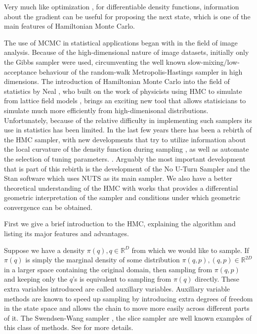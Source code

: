 \documentclass[12pt]{report}
\begin{document}
Very much like optimization \cite{wright1999numerical}, for differentiable density
functions, information about the gradient can be useful for proposing the next
state, which is one of the main features of Hamiltonian Monte Carlo.


The use of MCMC in statistical applications began with \cite{geman1984stochastic,besag1986statistical} in the field of image analysis. Because of the high-dimensional nature of image datasets, initially only the Gibbs sampler were used, circumventing the well known slow-mixing/low-acceptance behaviour of the random-walk Metropolis-Hastings sampler in high dimensions. The introduction of Hamiltonian Monte Carlo into the field of statistics by Neal \cite{neal2011mcmc,neal2012bayesian}, who built on the work of physicists using HMC to simulate from lattice field models \cite{duane1987hybrid}, brings an exciting new tool that allows statisicians to simulate much more efficiently from high-dimenisonal distributions. Unfortunately, because of the relative difficulty in implementing such samplers its use in statistics has been limited. In the last few years there has been a rebirth of the HMC sampler, with new developments that try to utilize information about the local curvature of the density function during  sampling \cite{girolami2011riemann,betancourt2013general}, as well as  automate the selection of tuning parameters.  \cite{hoffman2014no,betancourt2016identifying}. 
Arguably the most important development that is part of this rebirth is the development of the No U-Turn Sampler and the Stan software which uses NUTS as its main sampler. We also have a better theoretical understanding of the HMC with works \cite{betancourt2014geometric,livingstone2016geometric}
that provides a differential geometric interpretation of the sampler and conditions under which geometric convergence can be obtained.

First we give a brief introduction to the HMC, explaining the algorithm and listing its major features and advantages. 

Suppose we have a density $\pi(q),q \in \mathbb{R}^D$ from which we would like to
sample. If $\pi(q)$ is simply the marginal density of some distribution $\pi(q,p),
(q,p) \in \mathbb{R}^{2D}$ in a larger space containing the original domain, then sampling from $\pi(q,p)$ and keeping only the $q$'s is equivalent to sampling from $\pi(q)$ directly. These extra variables introduced are called auxillary variables. Auxillary variable methods are known to speed up sampling by introducing extra degrees of freedom in the state space and allows the chain to move more easily across different parts of it. The Swendsen-Wang sampler \cite{wang1990cluster}, the slice sampler\cite{wang1990cluster} are well known examples of this class of methods. See \cite{liang2011advanced,liu2008monte} for more details.
\end{document}
